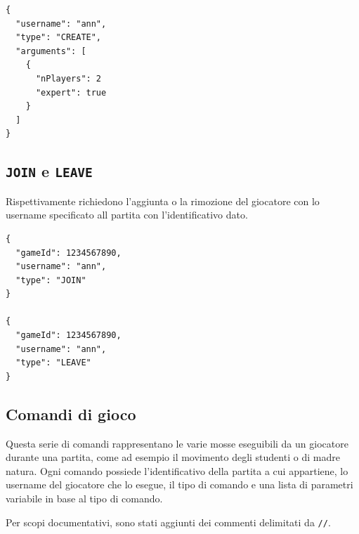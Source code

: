 \documentclass[a4paper,12pt]{article}
\begin{document}
\begin{verbatim}
{
  "username": "ann",
  "type": "CREATE",
  "arguments": [
    {
      "nPlayers": 2
      "expert": true
    }
  ]
}
\end{verbatim}

\subsection{\texttt{JOIN} e \texttt{LEAVE}}

Rispettivamente richiedono l'aggiunta o la rimozione del giocatore con lo
username specificato all partita  con l'identificativo dato.

\begin{verbatim}
{
  "gameId": 1234567890,
  "username": "ann",
  "type": "JOIN"
}

{
  "gameId": 1234567890,
  "username": "ann",
  "type": "LEAVE"
}
\end{verbatim}

\subsection{Comandi di gioco}

Questa serie di comandi rappresentano le varie mosse eseguibili da un
giocatore durante una partita, come ad esempio il movimento degli studenti
o di madre natura. Ogni comando possiede l'identificativo della partita a cui
appartiene, lo username del giocatore che lo esegue, il tipo di comando e
una lista di parametri variabile in base al tipo di comando.

Per scopi documentativi, sono stati aggiunti dei commenti delimitati da
\texttt{//}.
\end{document}
